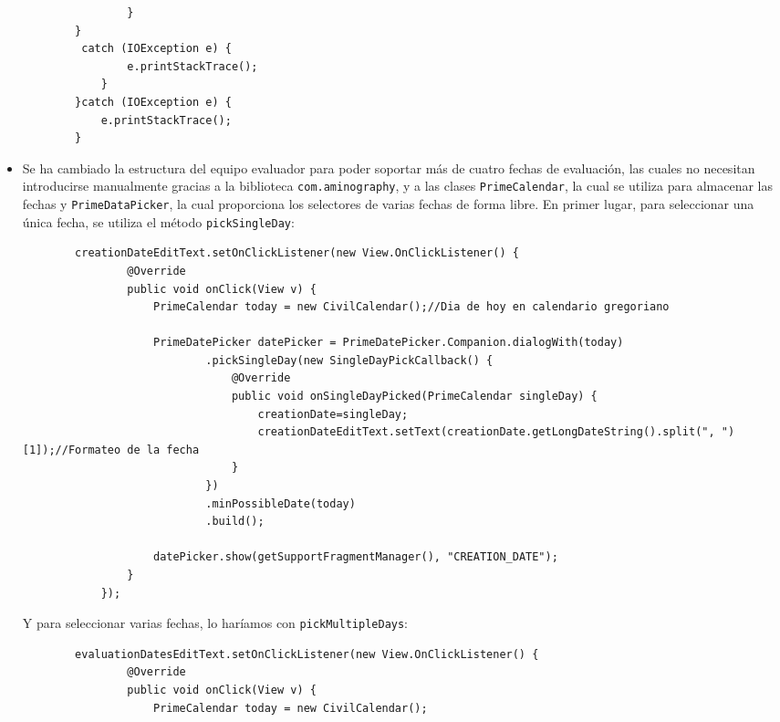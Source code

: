 \begin{itemize}
\begin{lstlisting}
                }
        }
         catch (IOException e) {
                e.printStackTrace();
            }
        }catch (IOException e) {
            e.printStackTrace();
        }
    \end{lstlisting}
    \item Se ha cambiado la estructura del equipo evaluador para poder soportar
    más de cuatro fechas de evaluación, las cuales no necesitan introducirse
    manualmente gracias a la biblioteca \texttt{com.aminography}, y a las clases
    \texttt{PrimeCalendar}\cite{githubGitHubAminographyPrimeCalendar}, la cual se utiliza para almacenar las fechas y
    \texttt{PrimeDataPicker}\cite{githubGitHubAminographyPrimeDatePicker}, la cual proporciona los selectores de varias
    fechas de forma libre. En primer lugar, para seleccionar una única fecha, se utiliza el método \texttt{pickSingleDay}:
    \begin{lstlisting}
        creationDateEditText.setOnClickListener(new View.OnClickListener() {
                @Override
                public void onClick(View v) {
                    PrimeCalendar today = new CivilCalendar();//Dia de hoy en calendario gregoriano

                    PrimeDatePicker datePicker = PrimeDatePicker.Companion.dialogWith(today)
                            .pickSingleDay(new SingleDayPickCallback() {
                                @Override
                                public void onSingleDayPicked(PrimeCalendar singleDay) {
                                    creationDate=singleDay;
                                    creationDateEditText.setText(creationDate.getLongDateString().split(", ")[1]);//Formateo de la fecha
                                }
                            })
                            .minPossibleDate(today)
                            .build();

                    datePicker.show(getSupportFragmentManager(), "CREATION_DATE");
                }
            });
    \end{lstlisting}
    Y para seleccionar varias fechas, lo haríamos con \texttt{pickMultipleDays}:
    \begin{lstlisting}
        evaluationDatesEditText.setOnClickListener(new View.OnClickListener() {
                @Override
                public void onClick(View v) {
                    PrimeCalendar today = new CivilCalendar();


\end{lstlisting}
\end{itemize}
